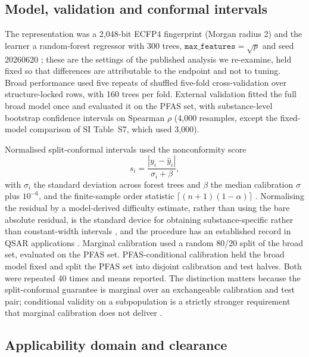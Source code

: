 \documentclass[preprint,12pt]{elsarticle}
\begin{document}
\subsection{Model, validation and conformal intervals}

The representation was a 2{,}048-bit ECFP4 fingerprint (Morgan radius 2)
\cite{rogers2010ecfp} and the learner a random-forest regressor with 300 trees,
$\texttt{max\_features}=\sqrt{p}$ and seed 20260620
\cite{breiman2001random,sklearn}; these are the settings of the published
analysis we re-examine, held fixed so that differences are attributable to the
endpoint and not to tuning. Broad performance used five repeats of shuffled
five-fold cross-validation over structure-locked rows, with 160 trees per fold. External validation
fitted the full broad model once and evaluated it on the PFAS set, with
substance-level bootstrap confidence intervals on Spearman $\rho$ (4{,}000
resamples, except the fixed-model comparison of SI Table~S7, which used
3{,}000).

Normalised split-conformal intervals used the nonconformity score
\begin{equation}
s_i=\frac{|y_i-\hat y_i|}{\sigma_i+\beta},
\end{equation}
with $\sigma_i$ the standard deviation across forest trees and $\beta$ the
median calibration $\sigma$ plus $10^{-6}$, and the finite-sample order
statistic $\lceil(n+1)(1-\alpha)\rceil$
\cite{vovk2005algorithmic,shafer2008tutorial,lei2018distfree}. Normalising the
residual by a model-derived difficulty estimate, rather than using the bare
absolute residual, is the standard device for obtaining substance-specific
rather than constant-width intervals
\cite{papadopoulos2011cpknn,cortesciriano2019deepconf}, and the procedure has
an established record in {QSAR} applications
\cite{norinder2014conformal,angelopoulos2023gentle}. Marginal calibration used a random
80/20 split of the broad set, evaluated on the PFAS set. PFAS-conditional
calibration held the broad model fixed and split the PFAS set into disjoint
calibration and test halves. Both were repeated 40 times and means reported. The distinction matters
because the split-conformal guarantee is marginal over an exchangeable
calibration and test pair; conditional validity on a subpopulation is a strictly
stronger requirement that marginal calibration does not deliver
\cite{vovk2012conditional}.

\subsection{Applicability domain and clearance}
\end{document}
